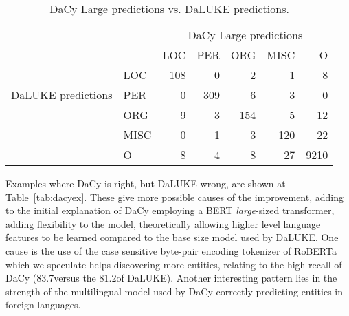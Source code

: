 \documentclass[main.tex]{subfiles}
\begin{document}
\begin{table}[H]
    \centering
    \begin{tabular}{l l | r r r r r }
        & &	\multicolumn{5}{c}{DaCy Large predictions}	\\
        \multirow{5}{*}{DaLUKE predictions} & & LOC & PER & ORG & MISC & O \\\hline
           & LOC                             &  108 & 0   & 2   & 1    & 8\\
           & PER                             &  0   & 309 & 6   & 3    & 0\\
           & ORG                             &  9   & 3   & 154 & 5    & 12\\
           & MISC                            &  0   & 1   & 3   & 120  & 22\\
           & O                               &  8   & 4   & 8   & 27   & 9210
    \end{tabular}
    \label{tab:dacycompare}
    \caption{
        DaCy Large predictions vs. DaLUKE predictions.
    }
\end{table}\noindent
Examples where DaCy is right, but DaLUKE wrong, are shown at Table~\ref{tab:dacyex}.
These give more possible causes of the improvement, adding to the initial explanation of DaCy employing a BERT \emph{large}-sized transformer, adding flexibility to the model, theoretically allowing higher level language features to be learned compared to the base size model used by DaLUKE.
One cause is the use of the case sensitive byte-pair encoding tokenizer of RoBERTa \cite{conneau2020unsupervised} which we speculate helps discovering more entities, relating to the high recall of DaCy (83.7\pro versus the 81.2\pro of DaLUKE).
Another interesting pattern lies in the strength of the multilingual model used by DaCy correctly predicting entities in foreign languages.
\end{document}
